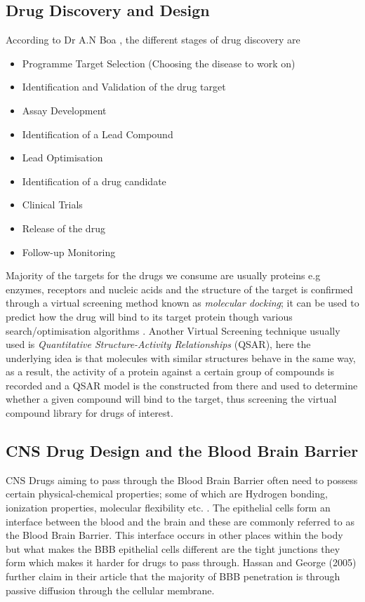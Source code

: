 \documentclass[a4paper,12pt]{article}
\begin{document}
		\subsection{Drug Discovery and Design}
		According to Dr A.N Boa \cite{hull2016}, the different stages of drug discovery are
			\begin{itemize}
				\item Programme Target Selection (Choosing the disease to work on)
				\item Identification and Validation of the drug target
				\item Assay Development
				\item Identification of a Lead Compound
				\item Lead Optimisation
				\item Identification of a drug candidate 
				\item Clinical Trials 
				\item Release of the drug 
				\item Follow-up Monitoring
			\end{itemize}
		Majority of the targets for the drugs we consume are usually proteins e.g enzymes, receptors and nucleic acids and the structure of the target is confirmed through a virtual screening method known as \textit{molecular docking}; it can be used to predict how the drug will bind to its target protein though various search/optimisation algorithms \cite{Jurgen2004}.
		Another Virtual Screening technique usually used is \textit{Quantitative Structure-Activity Relationships} (QSAR), here the underlying idea is that molecules with similar structures behave in the same way, as a result, the activity of a protein against a certain group of compounds is recorded and a QSAR model is the constructed from there and used to determine whether a given compound will bind to the target, thus screening the virtual compound library for drugs of interest.
		\subsection{CNS Drug Design and the Blood Brain Barrier}
		CNS Drugs aiming to pass through the Blood Brain Barrier often need to possess certain physical-chemical properties; some of which are Hydrogen bonding, ionization properties, molecular flexibility etc. \cite{Hassanetal2005}. The epithelial cells form an interface between the blood and the brain and these are commonly referred to as the Blood Brain Barrier. This interface occurs in other places within the body but what makes the BBB epithelial cells different are the tight junctions they form which makes it harder for drugs to pass through. Hassan and George (2005) further claim in their article that the majority of BBB penetration is through passive diffusion through the cellular membrane.
\end{document}
